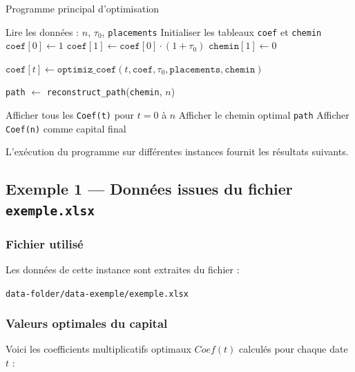 \documentclass[a4paper,11pt]{article}
\begin{document}
\begin{algorithm}[H]
\caption{Programme principal d’optimisation}
\begin{algorithmic}[1]
    \State Lire les données : $n$, $\tau_0$, \texttt{placements} 
    \State Initialiser les tableaux \texttt{coef} et \texttt{chemin}
    \State $\texttt{coef}[0] \gets 1$
    \State $\texttt{coef}[1] \gets \texttt{coef}[0] \cdot (1 + \tau_0)$
    \State $\texttt{chemin}[1] \gets 0$

        \State $\texttt{coef}[t] \gets \texttt{optimiz\_coef}(t, \texttt{coef}, \tau_0, \texttt{placements}, \texttt{chemin})$
    \EndFor

    \State \texttt{path} $\gets$ \texttt{reconstruct\_path}(\texttt{chemin}, $n$)

    \State Afficher tous les \texttt{Coef(t)} pour $t = 0$ à $n$
    \State Afficher le chemin optimal \texttt{path}
    \State Afficher \texttt{Coef(n)} comme capital final
\EndFunction
\end{algorithmic}
\end{algorithm}


L’exécution du programme sur différentes instances fournit les résultats suivants.

\subsection{Exemple 1 — Données issues du fichier \texttt{exemple.xlsx}}

\subsubsection{Fichier utilisé}

Les données de cette instance sont extraites du fichier :

\begin{center}
\texttt{data-folder/data-exemple/exemple.xlsx}
\end{center}

\vspace{0.3cm}

\subsubsection{Valeurs optimales du capital}

Voici les coefficients multiplicatifs optimaux $Coef(t)$ calculés pour chaque date $t$ :
\end{document}
